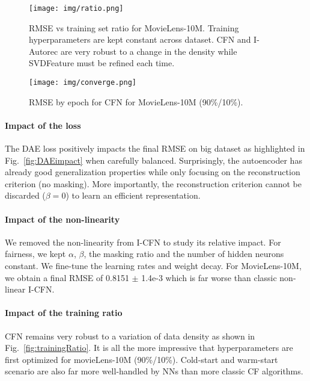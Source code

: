 \documentclass{article}
\begin{document}
\begin{figure*}[t]
\centering
\begin{minipage}{.60\textwidth}
	\centering
	\texttt{[image: img/ratio.png]}
	\caption{RMSE vs training set ratio for MovieLens-10M. Training hyperparameters are kept constant across dataset. CFN and I-Autorec are very robust to a change in the density while SVDFeature must be refined each time.}
	\label{fig:trainingRatio}
\end{minipage}
\quad
\begin{minipage}{.35\textwidth}
    \centering
    \texttt{[image: img/converge.png]}
    \caption{RMSE by epoch for CFN for MovieLens-10M (90\%/10\%). 
    }
    \label{fig:converge}
\end{minipage}
\end{figure*}

\vspace{-0.5em}
\paragraph{Impact of the loss}
The DAE loss positively impacts the final RMSE on big dataset as highlighted in Fig.~\ref{fig:DAEimpact} when carefully balanced. Surprisingly, the autoencoder has already good generalization properties while only focusing on the reconstruction criterion (no masking). More importantly, the reconstruction criterion cannot be discarded  ($\beta=0$) to learn an efficient representation. \vspace{-0.5em}
\paragraph{Impact of the non-linearity}
We removed the non-linearity from I-CFN to study its relative impact. For fairness, we kept $\alpha$, $\beta$, the masking ratio and the number of hidden neurons constant. We fine-tune the learning rates and weight decay. For MovieLens-10M, we obtain a final RMSE of 0.8151 $\pm$ 1.4e-3 which is far worse than classic non-linear I-CFN. 
\vspace{-0.5em}
\paragraph{Impact of the training ratio}
CFN remains very robust to a variation of data density as shown in Fig.~\ref{fig:trainingRatio}. It is all the more impressive that hyperparameters are first optimized for movieLens-10M (90\%/10\%). Cold-start and warm-start scenario are also far more well-handled by NNs than more classic CF algorithms. 
\end{document}
